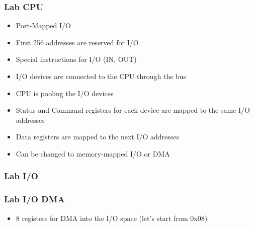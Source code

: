 \begin{frame}
    \frametitle{Lab CPU}
    \begin{itemize}
        \item Port-Mapped I/O
        \item First 256 addresses are reserved for I/O
        \item Special instructions for I/O (IN, OUT)
        \item I/O devices are connected to the CPU through the bus
        \item CPU is pooling the I/O devices
        \item Status and Command registers for each device are mapped to the same I/O addresses
        \item Data registers are mapped to the next I/O addresses
        \item Can be changed to memory-mapped I/O or DMA
    \end{itemize}
\end{frame}

\begin{frame}
    \frametitle{Lab I/O}
    \begin{figure}
        \centering
    \end{figure}
\end{frame}

\begin{frame}
    \frametitle{Lab I/O DMA}
    \begin{itemize}
        \item 8 registers for DMA into the I/O space (let's start from 0x08)
    \end{itemize}
    \begin{table}[]
    \end{table}
\end{frame}

